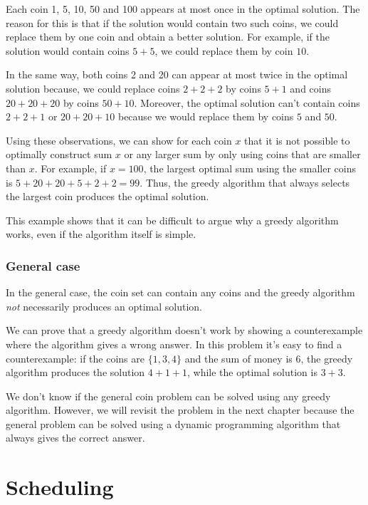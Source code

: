 Each coin 1, 5, 10, 50 and 100 appears
at most once in the optimal solution.
The reason for this is that if the
solution would contain two such coins,
we could replace them by one coin and
obtain a better solution.
For example, if the solution would contain
coins $5+5$, we could replace them by coin $10$.

In the same way, both coins 2 and 20 can appear
at most twice in the optimal solution
because, we could replace
coins $2+2+2$ by coins $5+1$ and
coins $20+20+20$ by coins $50+10$.
Moreover, the optimal solution can't contain
coins $2+2+1$ or $20+20+10$
because we would replace them by coins $5$ and $50$.

Using these observations,
we can show for each coin $x$ that
it is not possible to optimally construct
sum $x$ or any larger sum by only using coins
that are smaller than $x$.
For example, if $x=100$, the largest optimal
sum using the smaller coins is  $5+20+20+5+2+2=99$.
Thus, the greedy algorithm that always selects
the largest coin produces the optimal solution.

This example shows that it can be difficult
to argue why a greedy algorithm works,
even if the algorithm itself is simple.

\subsubsection{General case}

In the general case, the coin set can contain any coins
and the greedy algorithm \emph{not} necessarily produces
an optimal solution.

We can prove that a greedy algorithm doesn't work
by showing a counterexample
where the algorithm gives a wrong answer.
In this problem it's easy to find a counterexample:
if the coins are $\{1,3,4\}$ and the sum of money
is 6, the greedy algorithm produces the solution
$4+1+1$, while the optimal solution is $3+3$.

We don't know if the general coin problem
can be solved using any greedy algorithm.
However, we will revisit the problem in the next chapter
because the general problem can be solved using a dynamic
programming algorithm that always gives the
correct answer.

\section{Scheduling}

